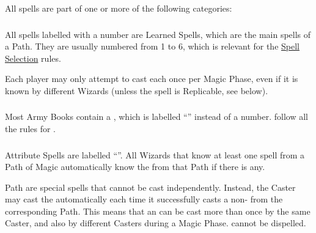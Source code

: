 All spells are part of one or more of the following categories:

\subsubsection{\learnedspells}
\label{learned_spells}

All spells labelled with a number are Learned Spells, which are the main spells of a Path. They are usually numbered from 1 to 6, which is relevant for the \hyperref[spell_selection]{Spell Selection} rules.

Each player may only attempt to cast each \learnedspell{} once per Magic Phase, even if it is known by different Wizards (unless the spell is Replicable, see below).

\subsubsection{\hereditaryspells}
\idx[main=y]{\hereditaryspells}\label{hereditary_spells}

Most Army Books contain a \hereditaryspell{}, which is labelled \enquote{\textbf{\hereditaryspellnumber}} instead of a number. \hereditaryspells{} follow all the rules for \learnedspells{}.

\subsubsection{\attributespells}
\idx[main=y]{\attributespells}\label{attribute_spells}

Attribute Spells are labelled \enquote{\textbf{\attributespellnumber}}. All Wizards that know at least one spell from a Path of Magic automatically know the \attributespell{} from that Path if there is any.

Path \attributespells{} are special spells that cannot be cast independently. Instead, the Caster may cast the \attributespell{} automatically each time it successfully casts a non-\attributespell{} from the corresponding Path. This means that an \attributespell{} can be cast more than once by the same Caster, and also by different Casters during a Magic Phase. \attributespells{} cannot be dispelled.

\subsubsection{\replicablespells}
\idx[main=y]{\replicablespells}\label{replicable_spells}


